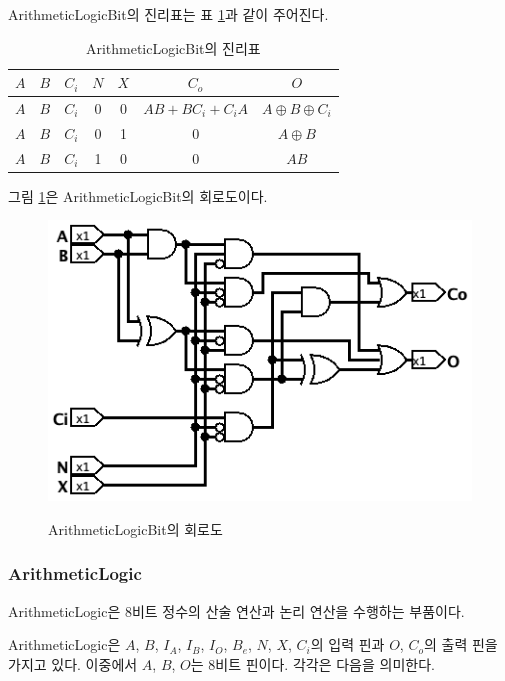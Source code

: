 \documentclass{article}
\renewcommand{\figurename}{그림}
\renewcommand{\tablename}{표}
\begin{document}
ArithmeticLogicBit의 진리표는 \tablename{} \ref{tab:alb}과 같이 주어진다.

\begin{table}[h]
    \centering
    \begin{tabular}{ccccc|cc}
        $A$ & $B$ & $C_i$ & $N$ & $X$ & $C_o$ & $O$ \\
        \hline
        $A$ & $B$ & $C_i$ &  0 &  0 & $AB + BC_i + C_iA$ & $A \oplus B \oplus C_i$ \\
        $A$ & $B$ & $C_i$ &  0 &  1 &  0 & $A \oplus B$ \\
        $A$ & $B$ & $C_i$ &  1 &  0 &  0 & $AB$ \\
    \end{tabular}
    \caption{ArithmeticLogicBit의 진리표}
    \label{tab:alb}
\end{table}

\figurename{} \ref{fig:alb}은 ArithmeticLogicBit의 회로도이다.

\begin{figure}[h]
    \centering
    \includegraphics[scale=0.5]{ArithmeticLogicBit} \\
    \caption{ArithmeticLogicBit의 회로도}
    \label{fig:alb}
\end{figure}

\subsubsection{ArithmeticLogic}

ArithmeticLogic은 8비트 정수의 산술 연산과 논리 연산을 수행하는 부품이다.

ArithmeticLogic은 $A$, $B$, $I_A$, $I_B$, $I_O$, $B_e$, $N$, $X$, $C_i$의 입력 핀과
$O$, $C_o$의 출력 핀을 가지고 있다.
이중에서 $A$, $B$, $O$는 8비트 핀이다.
각각은 다음을 의미한다.
\end{document}
